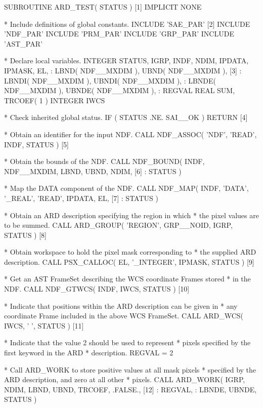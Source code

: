 \documentclass[11pt]{starlink}
\begin{document}
\small
\begin{terminalv}
      SUBROUTINE ARD_TEST( STATUS )                             [1]
      IMPLICIT NONE

*  Include definitions of global constants.
      INCLUDE 'SAE_PAR'                                         [2]
      INCLUDE 'NDF_PAR'
      INCLUDE 'PRM_PAR'
      INCLUDE 'GRP_PAR'
      INCLUDE 'AST_PAR'

*  Declare local variables.
      INTEGER STATUS, IGRP, INDF, NDIM, IPDATA, IPMASK, EL,
     :        LBND( NDF__MXDIM ), UBND( NDF__MXDIM ),           [3]
     :        LBNDI( NDF__MXDIM ), UBNDI( NDF__MXDIM ),
     :        LBNDE( NDF__MXDIM ), UBNDE( NDF__MXDIM ),
     :        REGVAL
      REAL SUM, TRCOEF( 1 )
      INTEGER IWCS

*  Check inherited global status.
      IF ( STATUS .NE. SAI__OK ) RETURN                         [4]

*  Obtain an identifier for the input NDF.
      CALL NDF_ASSOC( 'NDF', 'READ', INDF, STATUS )             [5]

*  Obtain the bounds of the NDF.
      CALL NDF_BOUND( INDF, NDF__MXDIM, LBND, UBND, NDIM,       [6]
     :                STATUS )

*  Map the DATA component of the NDF.
      CALL NDF_MAP( INDF, 'DATA', '_REAL', 'READ', IPDATA, EL,  [7]
     :              STATUS )

*  Obtain an ARD description specifying the region in which
*  the pixel values are to be summed.
      CALL ARD_GROUP( 'REGION', GRP__NOID, IGRP, STATUS )       [8]

*  Obtain workspace to hold the pixel mask corresponding to
*  the supplied ARD description.
      CALL PSX_CALLOC( EL, '_INTEGER', IPMASK, STATUS )         [9]

*  Get an AST FrameSet describing the WCS coordinate Frames stored
*  in the NDF.
      CALL NDF_GTWCS( INDF, IWCS, STATUS )                      [10]

*  Indicate that positions within the ARD description can be given in
*  any coordinate Frame included in the above WCS FrameSet.
      CALL ARD_WCS( IWCS, ' ', STATUS )                              [11]

*  Indicate that the value 2 should be used to represent
*  pixels specified by the first keyword in the ARD
*  description.
      REGVAL = 2

*  Call ARD_WORK to store positive values at all mask pixels
*  specified by the ARD description, and zero at all other
*  pixels.
      CALL ARD_WORK( IGRP, NDIM, LBND, UBND, TRCOEF, .FALSE.,   [12]
     :               REGVAL, %
     :               LBNDE,  UBNDE, STATUS )


\end{terminalv}
\end{document}
